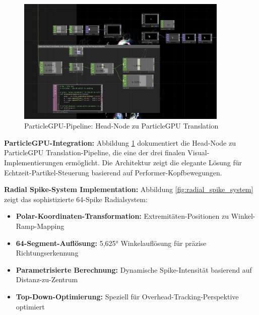 \begin{figure}[H]
    \centering
    \includegraphics[width=0.9\textwidth]{images/docupictures/NoisyBlob_HEAD_to_ParticleGPU_Translate.png}
    \caption{ParticleGPU-Pipeline: Head-Node zu ParticleGPU Translation}
    \label{fig:particle_translation}
\end{figure}

\textbf{ParticleGPU-Integration:}
Abbildung \ref{fig:particle_translation} dokumentiert die Head-Node zu ParticleGPU Translation-Pipeline, die eine der drei finalen Visual-Implementierungen ermöglicht. Die Architektur zeigt die elegante Lösung für Echtzeit-Partikel-Steuerung basierend auf Performer-Kopfbewegungen.


\textbf{Radial Spike-System Implementation:}
Abbildung \ref{fig:radial_spike_system} zeigt das sophistizierte 64-Spike Radialsystem:
\begin{itemize}
    \item \textbf{Polar-Koordinaten-Transformation:} Extremitäten-Positionen zu Winkel-Ramp-Mapping
    \item \textbf{64-Segment-Auflösung:} 5,625° Winkelauflösung für präzise Richtungserkennung
    \item \textbf{Parametrisierte Berechnung:} Dynamische Spike-Intensität basierend auf Distanz-zu-Zentrum
    \item \textbf{Top-Down-Optimierung:} Speziell für Overhead-Tracking-Perspektive optimiert
\end{itemize}

